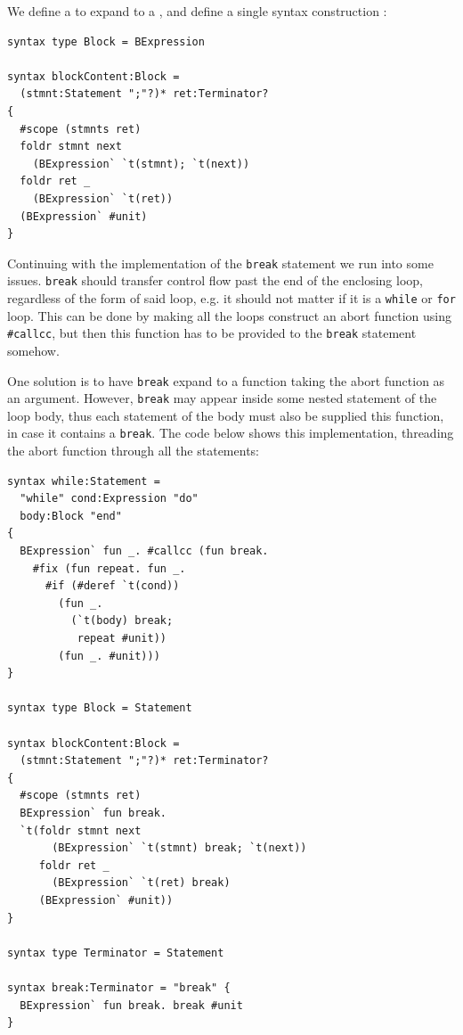 \documentclass{kththesis}
\begin{document}
We define a  to expand to a , and define a single syntax construction :

\begin{verbatim}
syntax type Block = BExpression

syntax blockContent:Block =
  (stmnt:Statement ";"?)* ret:Terminator?
{
  #scope (stmnts ret)
  foldr stmnt next
    (BExpression` `t(stmnt); `t(next))
  foldr ret _
    (BExpression` `t(ret))
  (BExpression` #unit)
}
\end{verbatim}

Continuing with the implementation of the \texttt{break} statement we run into some issues. \texttt{break} should transfer control flow past the end of the enclosing loop, regardless of the form of said loop, e.g. it should not matter if it is a \texttt{while} or \texttt{for} loop. This can be done by making all the loops construct an abort function using \texttt{#callcc}, but then this function has to be provided to the \texttt{break} statement somehow.

One solution is to have \texttt{break} expand to a function taking the abort function as an argument. However, \texttt{break} may appear inside some nested statement of the loop body, thus each statement of the body must also be supplied this function, in case it contains a \texttt{break}. The code below shows this implementation, threading the abort function through all the statements:

\begin{verbatim}
syntax while:Statement =
  "while" cond:Expression "do"
  body:Block "end"
{
  BExpression` fun _. #callcc (fun break.
    #fix (fun repeat. fun _.
      #if (#deref `t(cond))
        (fun _.
          (`t(body) break;
           repeat #unit))
        (fun _. #unit)))
}

syntax type Block = Statement

syntax blockContent:Block =
  (stmnt:Statement ";"?)* ret:Terminator?
{
  #scope (stmnts ret)
  BExpression` fun break.
  `t(foldr stmnt next
       (BExpression` `t(stmnt) break; `t(next))
     foldr ret _
       (BExpression` `t(ret) break)
     (BExpression` #unit))
}

syntax type Terminator = Statement

syntax break:Terminator = "break" {
  BExpression` fun break. break #unit
}
\end{verbatim}
\end{document}
